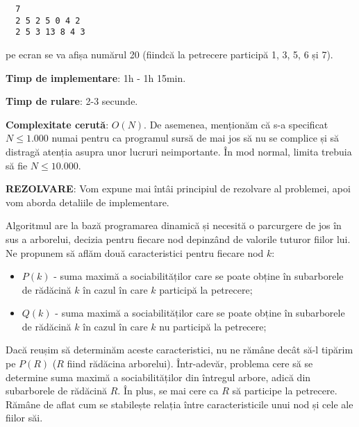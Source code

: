 \begin{verbatim}
  7
  2 5 2 5 0 4 2
  2 5 3 13 8 4 3
\end{verbatim}

pe ecran se va afișa numărul 20 (fiindcă la petrecere participă 1, 3, 5, 6 și
7).

{\bf Timp de implementare}: 1h - 1h 15min.

{\bf Timp de rulare}: 2-3 secunde.

{\bf Complexitate cerută}: $O(N)$. De asemenea, menționăm că s-a specificat $N
\leq 1.000$ numai pentru ca programul sursă de mai jos să nu se complice și să
distragă atenția asupra unor lucruri neimportante. În mod normal, limita
trebuia să fie $N \leq 10.000$.

{\bf REZOLVARE}: Vom expune mai întâi principiul de rezolvare al problemei,
apoi vom aborda detaliile de implementare.

Algoritmul are la bază programarea dinamică și necesită o parcurgere de jos în
sus a arborelui, decizia pentru fiecare nod depinzând de valorile tuturor
fiilor lui. Ne propunem să aflăm două caracteristici pentru fiecare nod $k$:

\begin{itemize}

\item $P(k)$ - suma maximă a sociabilităților care se poate obține în
  subarborele de rădăcină $k$ în cazul în care $k$ participă la petrecere;

\item $Q(k)$ - suma maximă a sociabilităților care se poate obține în
  subarborele de rădăcină $k$ în cazul în care $k$ nu participă la petrecere;

\end{itemize}

Dacă reușim să determinăm aceste caracteristici, nu ne rămâne decât să-l
tipărim pe $P(R)$ ($R$ fiind rădăcina arborelui). Într-adevăr, problema cere
să se determine suma maximă a sociabilităților din întregul arbore, adică din
subarborele de rădăcină $R$. În plus, se mai cere ca $R$ să participe la
petrecere. Rămâne de aflat cum se stabilește relația între caracteristicile
unui nod și cele ale fiilor săi.

